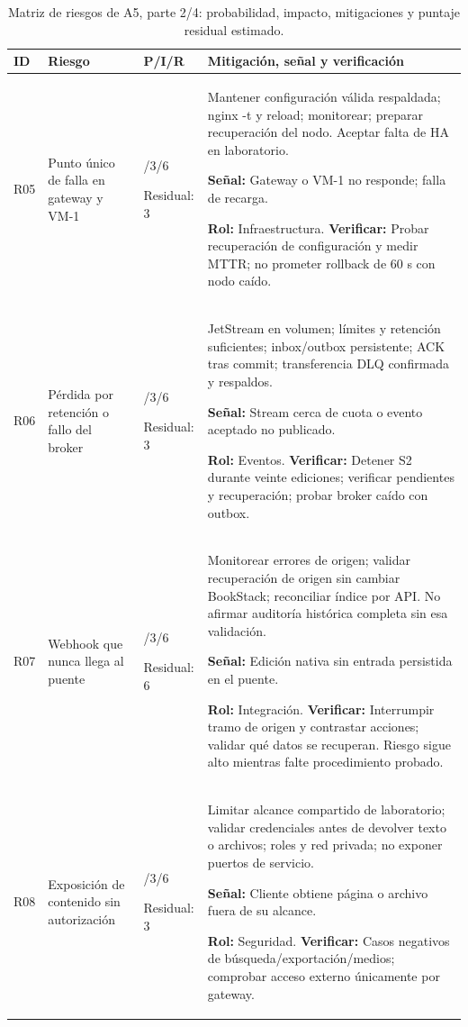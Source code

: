 \clearpage
\begin{table}[H]
\centering\small
\setlength{\tabcolsep}{4pt}
\renewcommand{\arraystretch}{1.10}
\caption{Matriz de riesgos de A5, parte 2/4: probabilidad, impacto, mitigaciones y puntaje residual estimado.}\label{tab:a5-riesgos-2}
\begin{tabularx}{\textwidth}{>{\raggedright\arraybackslash}p{0.75cm} >{\raggedright\arraybackslash}p{2.8cm} >{\raggedright\arraybackslash}p{1.8cm} >{\raggedright\arraybackslash}X}
\toprule
\textbf{ID} & \textbf{Riesgo} & \textbf{P/I/R} & \textbf{Mitigación, señal y verificación} \\
\midrule
R05 & Punto único de falla en gateway y VM-1 & 2/3/6\par Residual: 3 & Mantener configuración válida respaldada; nginx -t y reload; monitorear; preparar recuperación del nodo. Aceptar falta de HA en laboratorio.\par\textbf{Señal:} Gateway o VM-1 no responde; falla de recarga.\par\textbf{Rol:} Infraestructura. \textbf{Verificar:} Probar recuperación de configuración y medir MTTR; no prometer rollback de 60 s con nodo caído. \\[4pt]
R06 & Pérdida por retención o fallo del broker & 2/3/6\par Residual: 3 & JetStream en volumen; límites y retención suficientes; inbox/outbox persistente; ACK tras commit; transferencia DLQ confirmada y respaldos.\par\textbf{Señal:} Stream cerca de cuota o evento aceptado no publicado.\par\textbf{Rol:} Eventos. \textbf{Verificar:} Detener S2 durante veinte ediciones; verificar pendientes y recuperación; probar broker caído con outbox. \\[4pt]
R07 & Webhook que nunca llega al puente & 2/3/6\par Residual: 6 & Monitorear errores de origen; validar recuperación de origen sin cambiar BookStack; reconciliar índice por API. No afirmar auditoría histórica completa sin esa validación.\par\textbf{Señal:} Edición nativa sin entrada persistida en el puente.\par\textbf{Rol:} Integración. \textbf{Verificar:} Interrumpir tramo de origen y contrastar acciones; validar qué datos se recuperan. Riesgo sigue alto mientras falte procedimiento probado. \\[4pt]
R08 & Exposición de contenido sin autorización & 2/3/6\par Residual: 3 & Limitar alcance compartido de laboratorio; validar credenciales antes de devolver texto o archivos; roles y red privada; no exponer puertos de servicio.\par\textbf{Señal:} Cliente obtiene página o archivo fuera de su alcance.\par\textbf{Rol:} Seguridad. \textbf{Verificar:} Casos negativos de búsqueda/exportación/medios; comprobar acceso externo únicamente por gateway. \\[4pt]
\bottomrule
\end{tabularx}
\end{table}
